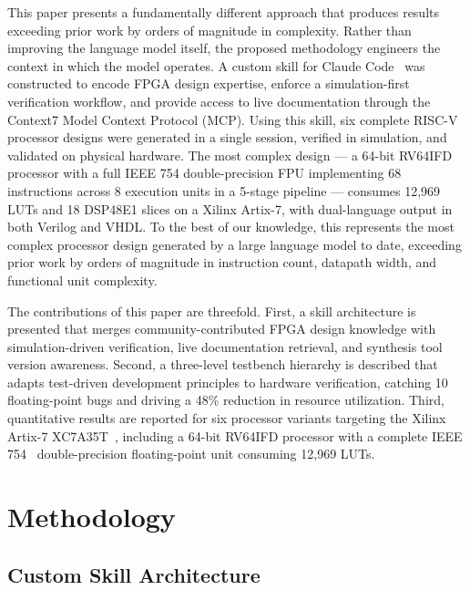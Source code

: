 \documentclass[conference]{IEEEtran}
\begin{document}
This paper presents a fundamentally different approach that produces results exceeding prior work by orders of magnitude in complexity. Rather than improving the language model itself, the proposed methodology engineers the context in which the model operates. A custom skill for Claude Code~\cite{anthropic2026claude} was constructed to encode FPGA design expertise, enforce a simulation-first verification workflow, and provide access to live documentation through the Context7 Model Context Protocol (MCP). Using this skill, six complete RISC-V~\cite{waterman2019riscv} processor designs were generated in a single session, verified in simulation, and validated on physical hardware. The most complex design --- a 64-bit RV64IFD processor with a full IEEE 754 double-precision FPU implementing 68 instructions across 8 execution units in a 5-stage pipeline --- consumes 12,969 LUTs and 18 DSP48E1 slices on a Xilinx Artix-7, with dual-language output in both Verilog and VHDL. To the best of our knowledge, this represents the most complex processor design generated by a large language model to date, exceeding prior work by orders of magnitude in instruction count, datapath width, and functional unit complexity.

The contributions of this paper are threefold. First, a skill architecture is presented that merges community-contributed FPGA design knowledge with simulation-driven verification, live documentation retrieval, and synthesis tool version awareness. Second, a three-level testbench hierarchy is described that adapts test-driven development principles to hardware verification, catching 10 floating-point bugs and driving a 48\% reduction in resource utilization. Third, quantitative results are reported for six processor variants targeting the Xilinx Artix-7 XC7A35T~\cite{xilinx2020ds180}, including a 64-bit RV64IFD processor with a complete IEEE 754~\cite{ieee754_2019} double-precision floating-point unit consuming 12,969 LUTs.

\section{Methodology}

\subsection{Custom Skill Architecture}
\end{document}
